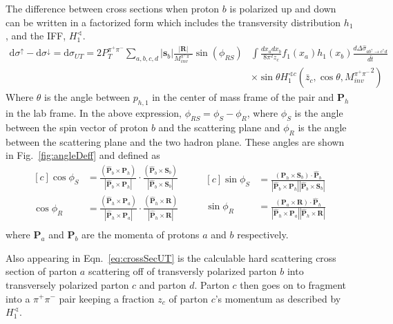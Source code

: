 \documentclass[letterpaper, abstract = on,listof=totoc, bibliography=totoc]{scrreprt}
\newcommand{\phir}{\phi_{R}}
\newcommand{\phis}{\phi_{S}}
\newcommand{\phirs}{\phi_{RS}}
\newcommand{\ptpair}{P_{T}^{\pi^+\pi^-}}
\newcommand{\mpair}{M_{inv}^{\pi^+\pi^-}}
\newcommand{\pip}{\pi^+}
\newcommand{\pim}{\pi^-}
\newcommand{\pair}{$\pip\pim$ }
\begin{document}
The difference between cross sections when proton $b$ is polarized up and down can be written in a factorized form which includes the transversity distribution $h_1$, and the IFF, $H_1^{\sphericalangle}$.
\begin{align}
\label{eq:crossSecUT}
\text{d}\sigma^\uparrow - \text{d}\sigma^\downarrow = \text{d}\sigma_{UT} = 2\ptpair \sum_{a,b,c,d} |\boldsymbol{s}_b| \frac{|\boldsymbol{R}|}{\mpair}\sin(\phirs) & \int \frac{dx_a dx_b}{8\pi^2 z_c} f_1(x_a) h_1(x_b) \frac{d\Delta\hat{\sigma}_{a b^\uparrow \rightarrow c^\uparrow d}}{d\hat{t}} \nonumber \\ 
&\times \sin\theta H_1^{\sphericalangle c} \left(\bar{z}_c,\cos\theta, {\mpair}^2\right) 
\end{align}
Where $\theta$ is the angle between $p_{h,1}$ in the center of mass frame of the pair and $\bm{P}_h$ in the lab frame. In the above expression, $\phirs = \phis-\phir$, where $\phis$ is the angle between the spin vector of proton $b$ and the scattering plane and $\phir$ is the angle between the scattering plane and the two hadron plane. These angles are shown in Fig.~\ref{fig:angleDeff} and defined as \cite{bacchettaRadici2}
\begin{equation}
\label{eq:angles}
\begin{aligned}[c]
\cos\phi_S &= \frac{(\bm{\hat{P}}_b \times \bm{P}_h)}{|\bm{\hat{P}}_b \times \bm{P}_h|} \cdot \frac{(\bm{\hat{P}}_b \times \bm{S}_b)}{|\bm{\hat{P}}_b \times \bm{S}_b|} \\
\cos\phi_R &= \frac{(\bm{\hat{P}}_h \times \bm{P}_a)}{|\bm{\hat{P}}_h \times \bm{P}_a|} \cdot \frac{(\bm{\hat{P}}_h \times \bm{R})}{|\bm{\hat{P}}_h \times \bm{R}|} \\
\end{aligned}
\qquad
\begin{aligned}[c]
\sin\phi_S &= \frac{(\bm{P}_h \times \bm{S}_b) \cdot \bm{\hat{P}}_b}{|\bm{\hat{P}}_b \times \bm{P}_h| |\bm{\hat{P}}_b \times \bm{S}_b|} \\
\sin\phi_R &= \frac{(\bm{P}_a \times \bm{R}) \cdot \bm{\hat{P}}_h}{|\bm{\hat{P}}_h \times \bm{P}_a| |\bm{\hat{P}}_h \times \bm{R}|} 
\end{aligned}
\end{equation}
where $\bm{P}_a$ and $\bm{P}_b$ are the momenta of protons $a$ and $b$ respectively.

Also appearing in Eqn.~\ref{eq:crossSecUT} is the calculable hard scattering cross section of parton $a$ scattering off of transversly polarized parton $b$ into transversely polarized parton $c$ and parton $d$. Parton $c$ then goes on to fragment into a \pair pair keeping a fraction $z_c$ of parton $c$'s momentum as described by $H_1^{\sphericalangle}$.
\end{document}
